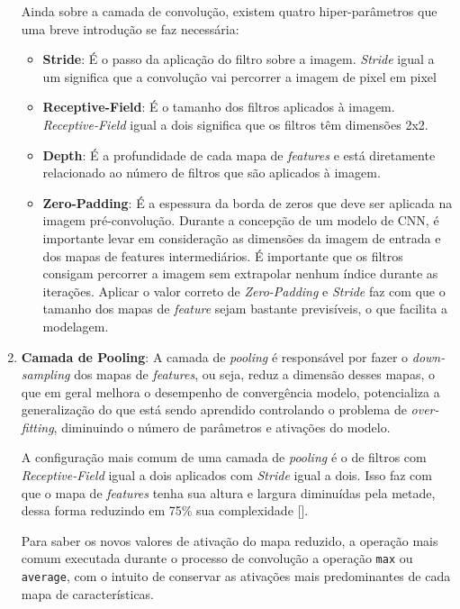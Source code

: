 \begin{enumerate}
            Ainda sobre a camada de convolução, existem quatro hiper-parâmetros que uma breve introdução se faz necessária:
            \begin{itemize}
                \item \textbf{Stride}: É o passo da aplicação do filtro sobre a imagem. \textit{Stride} igual a um significa que a convolução vai percorrer a imagem de pixel em pixel
                \item \textbf{Receptive-Field}: É o tamanho dos filtros aplicados à imagem. \textit{Receptive-Field} igual a dois significa que os filtros têm dimensões 2x2.
                \item \textbf{Depth}: É a profundidade de cada mapa de \textit{features} e está diretamente relacionado ao número de filtros que são aplicados à imagem.
                \item \textbf{Zero-Padding}: É a espessura da borda de zeros que deve ser aplicada na imagem pré-convolução. Durante a concepção de um modelo de CNN, é importante levar em consideração as dimensões da imagem de entrada e dos mapas de features intermediários. É importante que os filtros consigam percorrer a imagem sem extrapolar nenhum índice durante as iterações. Aplicar o valor correto de \textit{Zero-Padding} e \textit{Stride} faz com que o tamanho dos mapas de \textit{feature} sejam bastante previsíveis, o que facilita a modelagem.
            \end{itemize}
            
    \item \textbf{Camada de Pooling}:
            A camada de \textit{pooling} é responsável por fazer o \textit{down-sampling} dos mapas de \textit{features}, ou seja, reduz a dimensão desses mapas, o que em geral melhora o desempenho de convergência modelo, potencializa a generalização do que está sendo aprendido controlando o problema de \textit{over-fitting}, diminuindo o número de parâmetros e ativações do modelo.
            
            A configuração mais comum de uma camada de \textit{pooling} é o de filtros com \textit{Receptive-Field} igual a dois aplicados com \textit{Stride} igual a dois. Isso faz com que o mapa de \textit{features} tenha sua altura e largura diminuídas pela metade, dessa forma reduzindo em 75\% sua complexidade [].
            
            Para saber os novos valores de ativação do mapa reduzido, a operação mais comum executada durante o processo de convolução a operação \texttt{max} ou \texttt{average}, com o intuito de conservar as ativações mais predominantes de cada mapa de características.
            

\end{enumerate}
